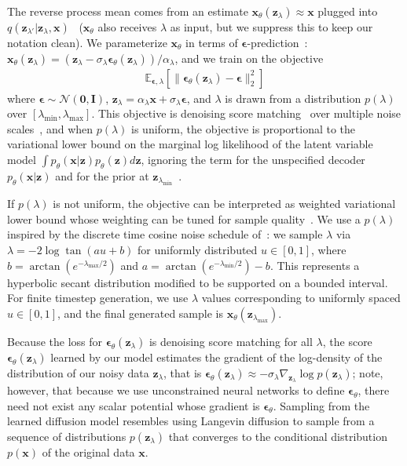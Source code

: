 \documentclass{article} %
\newcommand{\E}{\mathbb{E}}
\newcommand{\Eb}[2]{\E_{#1}\!\left[#2\right]}
\newcommand{\bI}{\mathbf{I}}
\newcommand{\bzero}{\mathbf{0}}
\newcommand{\bx}{\mathbf{x}}
\newcommand{\bz}{\mathbf{z}}
\newcommand{\bepsilon}{{\boldsymbol{\epsilon}}}
\begin{document}
The reverse process mean comes from an estimate $\bx_\theta(\bz_\lambda) \approx \bx$ plugged into $q(\bz_{\lambda'}|\bz_\lambda,\bx)$~\citep{ho2020denoising,kingma2021variational} ($\bx_\theta$ also receives $\lambda$ as input, but we suppress this to keep our notation clean). We parameterize $\bx_\theta$ in terms of $\bepsilon$-prediction~\citep{ho2020denoising}: $\bx_\theta(\bz_\lambda) = (\bz_\lambda - \sigma_\lambda \bepsilon_\theta(\bz_\lambda)) / \alpha_\lambda$, and we train on the objective
\begin{align}
    \Eb{\bepsilon,\lambda}{\|\bepsilon_\theta(\bz_\lambda) - \bepsilon \|^2_2}
\end{align}
where $\bepsilon\sim\mathcal{N}(\bzero,\bI)$, $\bz_\lambda = \alpha_\lambda\bx + \sigma_\lambda\bepsilon$, and $\lambda$ is drawn from a distribution $p(\lambda)$ over $[\lambda_{\mathrm{min}}, \lambda_{\mathrm{max}}]$. This objective is denoising score matching~\citep{vincent2011connection,hyvarinen2005estimation} over multiple noise scales~\citep{song2019generative}, and when $p(\lambda)$ is uniform, the objective is proportional to the variational lower bound on the marginal log likelihood of the latent variable model $\int p_\theta(\bx|\bz) p_\theta(\bz) d\bz$, ignoring the term for the unspecified decoder $p_\theta(\bx|\bz)$ and for the prior at $\bz_{\lambda_\mathrm{min}}$~\citep{kingma2021variational}.

If $p(\lambda)$ is not uniform, the objective can be interpreted as weighted variational lower bound whose weighting can be tuned for sample quality~\citep{ho2020denoising,kingma2021variational}. We use a $p(\lambda)$ inspired by the discrete time cosine noise schedule of~\citet{nichol2021improved}: we sample $\lambda$ via $\lambda = -2\log\tan(au+b)$ for uniformly distributed $u \in [0,1]$, where $b = \arctan(e^{-\lambda_{\mathrm{max}}/2})$ and $a = \arctan(e^{-\lambda_{\mathrm{min}}/2}) - b$. This represents a hyperbolic secant distribution modified to be supported on a bounded interval. For finite timestep generation, we use $\lambda$ values corresponding to uniformly spaced $u \in [0, 1]$, and the final generated sample is $\bx_\theta(\bz_{\lambda_\mathrm{max}})$.

Because the loss for $\bepsilon_\theta(\bz_\lambda)$ is denoising score matching for all $\lambda$,
the score $\bepsilon_\theta(\bz_\lambda)$ learned by our model  estimates the gradient of the log-density of the distribution of our noisy data $\bz_\lambda$, that is $\bepsilon_\theta(\bz_\lambda) \approx -\sigma_\lambda \nabla_{\bz_\lambda}\log p(\bz_\lambda)$; note, however, that because we use unconstrained neural networks to
define $\bepsilon_\theta$, there need not exist any scalar potential whose gradient is $\bepsilon_\theta$. Sampling from the learned diffusion model resembles using Langevin diffusion to sample from a sequence of distributions $p(\bz_\lambda)$ that converges to the conditional distribution $p(\bx)$ of the original data $\bx$.
\end{document}
